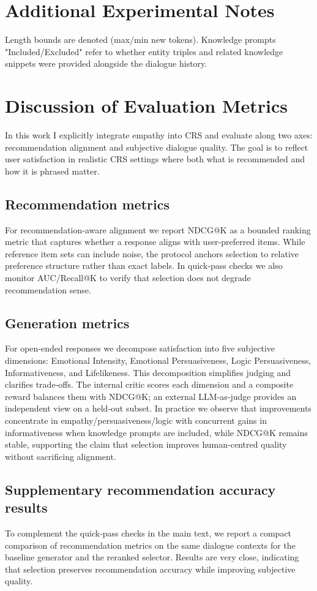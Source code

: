 \documentclass[12pt]{article}
\begin{document}
  \section{Additional Experimental Notes}
  Length bounds are denoted (max/min new tokens). Knowledge prompts "Included/Excluded" refer to whether entity triples and related knowledge snippets were provided alongside the dialogue history.
  
  \section{Discussion of Evaluation Metrics}
  In this work I explicitly integrate empathy into CRS and evaluate along two axes: recommendation alignment and subjective dialogue quality. The goal is to reflect user satisfaction in realistic CRS settings where both what is recommended and how it is phrased matter.
  
  \subsection{Recommendation metrics}
  For recommendation‑aware alignment we report NDCG@K as a bounded ranking metric that captures whether a response aligns with user‑preferred items. While reference item sets can include noise, the protocol anchors selection to relative preference structure rather than exact labels. In quick‑pass checks we also monitor AUC/Recall@K to verify that selection does not degrade recommendation sense.
  
  \subsection{Generation metrics}
  For open‑ended responses we decompose satisfaction into five subjective dimensions: Emotional Intensity, Emotional Persuasiveness, Logic Persuasiveness, Informativeness, and Lifelikeness. This decomposition simplifies judging and clarifies trade‑offs. The internal critic scores each dimension and a composite reward balances them with NDCG@K; an external LLM‑as‑judge provides an independent view on a held‑out subset. In practice we observe that improvements concentrate in empathy/persuasiveness/logic with concurrent gains in informativeness when knowledge prompts are included, while NDCG@K remains stable, supporting the claim that selection improves human‑centred quality without sacrificing alignment.

  \subsection{Supplementary recommendation accuracy results}
  To complement the quick‑pass checks in the main text, we report a compact comparison of recommendation metrics on the same dialogue contexts for the baseline generator and the reranked selector. Results are very close, indicating that selection preserves recommendation accuracy while improving subjective quality.
\end{document}
